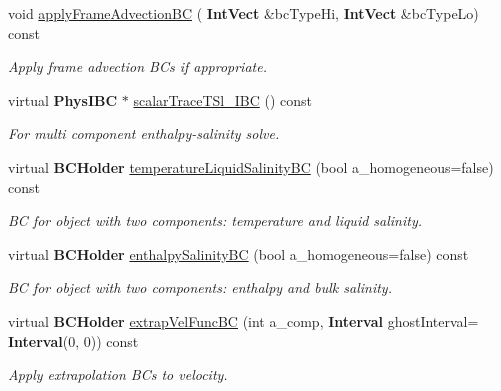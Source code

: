 \begin{DoxyCompactItemize}
\mbox{\label{class_phys_b_c_util_a3af9f8b837c0e396c93e81aa8443ddfc}} 
void \hyperlink{class_phys_b_c_util_a3af9f8b837c0e396c93e81aa8443ddfc}{apply\+Frame\+Advection\+BC} (\textbf{ Int\+Vect} \&bc\+Type\+Hi, \textbf{ Int\+Vect} \&bc\+Type\+Lo) const
\begin{DoxyCompactList}\small\item\em Apply frame advection B\+Cs if appropriate. \end{DoxyCompactList}\item 
\mbox{\label{class_phys_b_c_util_ac4b38170b19495eff390d5f0614728c3}} 
virtual \textbf{ Phys\+I\+BC} $\ast$ \hyperlink{class_phys_b_c_util_ac4b38170b19495eff390d5f0614728c3}{scalar\+Trace\+T\+Sl\+\_\+\+I\+BC} () const
\begin{DoxyCompactList}\small\item\em For multi component enthalpy-\/salinity solve. \end{DoxyCompactList}\item 
\mbox{\label{class_phys_b_c_util_a8d082782f7b8d40e0c1e43578724cd6a}} 
virtual \textbf{ B\+C\+Holder} \hyperlink{class_phys_b_c_util_a8d082782f7b8d40e0c1e43578724cd6a}{temperature\+Liquid\+Salinity\+BC} (bool a\+\_\+homogeneous=false) const
\begin{DoxyCompactList}\small\item\em BC for object with two components\+: temperature and liquid salinity. \end{DoxyCompactList}\item 
\mbox{\label{class_phys_b_c_util_ab9d3de31c276bbd83ff3f95c4dc38163}} 
virtual \textbf{ B\+C\+Holder} \hyperlink{class_phys_b_c_util_ab9d3de31c276bbd83ff3f95c4dc38163}{enthalpy\+Salinity\+BC} (bool a\+\_\+homogeneous=false) const
\begin{DoxyCompactList}\small\item\em BC for object with two components\+: enthalpy and bulk salinity. \end{DoxyCompactList}\item 
\mbox{\label{class_phys_b_c_util_a69363c5fe9ce806ac3fe76abe24137a2}} 
virtual \textbf{ B\+C\+Holder} \hyperlink{class_phys_b_c_util_a69363c5fe9ce806ac3fe76abe24137a2}{extrap\+Vel\+Func\+BC} (int a\+\_\+comp, \textbf{ Interval} ghost\+Interval=\textbf{ Interval}(0, 0)) const
\begin{DoxyCompactList}\small\item\em Apply extrapolation B\+Cs to velocity. \end{DoxyCompactList}\end{DoxyCompactItemize}

